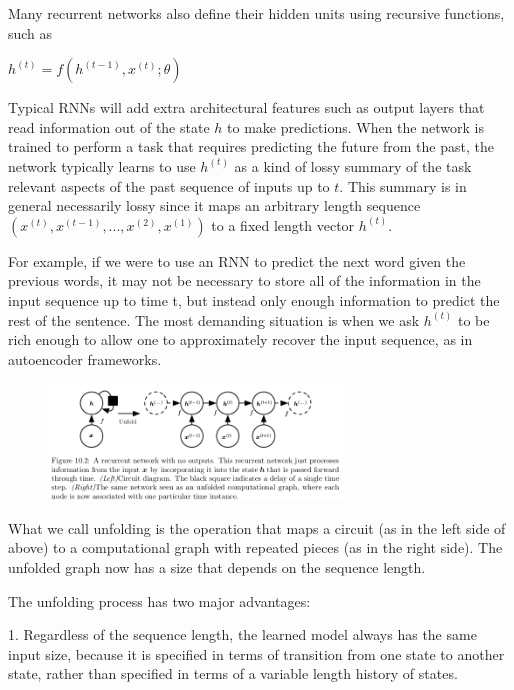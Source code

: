 \documentclass[letterpaper, 12pt]{report}
\begin{document}
Many recurrent networks also define their hidden units using recursive functions, such as 

\begin{center}
  $h^{(t)} = f(h^{(t-1)}, x^{(t)}; \theta)$
\end{center}

Typical RNNs will add extra architectural features such as output layers that read information out of the state $h$ to make predictions. When the network is trained to perform a task that requires predicting the future from the past, the network typically learns to use $h^{(t)}$ as a kind of lossy summary of the task relevant aspects of the past sequence of inputs up to $t$. This summary is in general necessarily lossy since it maps an arbitrary length sequence $(x^{(t)}, x^{(t-1)}, ..., x^{(2)}, x^{(1)})$ to a fixed length vector $h^{(t)}$. 

For example, if we were to use an RNN to predict the next word given the previous words, it may not be necessary to store all of the information in the input sequence up to time t, but instead only enough information to predict the rest of the sentence. The most demanding situation is when we ask $h^{(t)}$ to be rich enough to allow one to approximately recover the input sequence, as in autoencoder frameworks. 

\begin{figure}[h]
  \centering
  \includegraphics[width=0.7\textwidth]{rnn_dag.png}
\end{figure}

What we call unfolding is the operation that maps a circuit (as in the left side of above) to a computational graph with repeated pieces (as in the right side). The unfolded graph now has a size that depends on the sequence length. 

The unfolding process has two major advantages:

1. Regardless of the sequence length, the learned model always has the same input size, because it is specified in terms of transition from one state to another state, rather than specified in terms of a variable length history of states.
\end{document}
